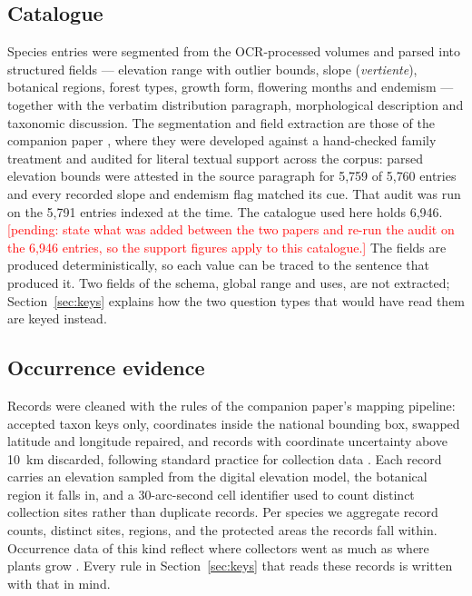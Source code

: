 \documentclass[11pt,a4paper]{article}
\newcommand{\pending}[1]{\textcolor{red}{[pending: #1]}}
\begin{document}
\subsection{Catalogue}
Species entries were segmented from the OCR-processed volumes and parsed into
structured fields --- elevation range with outlier bounds, slope (\emph{vertiente}),
botanical regions, forest types, growth form, flowering months and endemism ---
together with the verbatim distribution paragraph, morphological description and
taxonomic discussion. The segmentation and field extraction are those of the
companion paper \citep{araya2026grounding}, where they were developed against a
hand-checked family treatment and audited for literal textual support across the
corpus: parsed elevation bounds were attested in the source paragraph for 5{,}759 of
5{,}760 entries and every recorded slope and endemism flag matched its cue. That
audit was run on the 5{,}791 entries indexed at the time. The catalogue used here
holds 6{,}946. \pending{state what was added between the two papers and re-run the
audit on the 6{,}946 entries, so the support figures apply to this catalogue.} The
fields are produced deterministically, so each value can be traced to the sentence
that produced it. Two fields of the schema, global range and uses, are not extracted;
Section~\ref{sec:keys} explains how the two question types that would have read them
are keyed instead.

\subsection{Occurrence evidence}
Records were cleaned with the rules of the companion paper's mapping pipeline:
accepted taxon keys only, coordinates inside the national bounding box, swapped
latitude and longitude repaired, and records with coordinate uncertainty above 10~km
discarded, following standard practice for collection data
\citep{zizka2019coordinatecleaner}. Each record carries an elevation sampled from the
digital elevation model, the botanical region it falls in, and a 30-arc-second cell
identifier used to count distinct collection sites rather than duplicate records. Per
species we aggregate record counts, distinct sites, regions, and the protected areas
the records fall within. Occurrence data of this kind reflect where collectors went
as much as where plants grow \citep{beck2014spatial,meyer2016multidimensional}. Every
rule in Section~\ref{sec:keys} that reads these records is written with that in mind.
\end{document}
